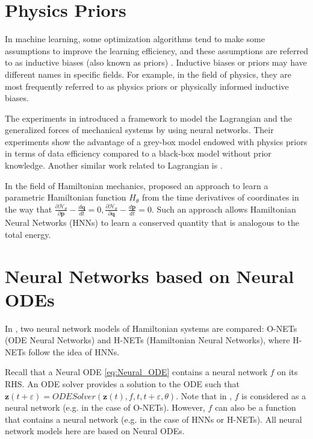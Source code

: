 \documentclass[
	parskip, 			   %
	twoside, 			   %
	DIV=14, 			   %
	BCOR=15.0mm, 		   %
	headsepline, 		   %
	open=right, 		   %
	captions=tableheading, %
	bibliography=totoc,    %
	numbers=noenddot       %
]{scrreprt}
\begin{document}
\section{Physics Priors}
In machine learning, some optimization algorithms tend to make some assumptions to improve the learning efficiency, and these assumptions are referred to as inductive biases (also known as priors) \cite{mitchell1997machine}. Inductive biases or priors may have different names in specific fields. For example, in the field of physics, they are most frequently referred to as physics priors or physically informed inductive biases.

The experiments in \cite{gupta2019general} introduced a framework to model the Lagrangian and the generalized forces of mechanical systems by using neural networks. Their experiments show the advantage of a grey-box model endowed with physics priors in terms of data efficiency compared to a black-box model without prior knowledge. Another similar work related to Lagrangian is \cite{lutter2019deep}.

In the field of Hamiltonian mechanics, \cite{greydanus2019hamiltonian} proposed an approach to learn a parametric Hamiltonian function $H_{\theta}$ from the time derivatives of coordinates in the way that $\frac{\partial \mathcal{H}_{\theta}}{\partial \mathbf{p}} - \frac{d\mathbf{q}}{dt} = 0, \frac{\partial \mathcal{H}_{\theta}}{\partial \mathbf{q}} - \frac{d\mathbf{p}}{dt} = 0 $. Such an approach allows Hamiltonian Neural Networks (HNNs) to learn a conserved quantity that is analogous to the total energy.

\section{Neural Networks based on Neural ODEs}
In \cite{chen2019symplectic}, two neural network models of Hamiltonian systems are compared: O-NETs (ODE Neural Networks) and H-NETs (Hamiltonian Neural Networks), where H-NETs follow the idea of HNNs. 

Recall that a Neural ODE \ref{eq:Neural_ODE} contains a neural network $f$ on its RHS. An ODE solver provides a solution to the ODE such that $\mathbf{z}(t+\varepsilon) = ODESolver(\mathbf{z}(t), f, t, t+\varepsilon , \theta)$. Note that in \cite{chen2019symplectic}, $f$ is considered as a neural network (e.g. in the case of O-NETs). However, $f$ can also be a function that contains a neural network (e.g. in the case of HNNs or H-NETs). All neural network models here are based on Neural ODEs.
\end{document}
